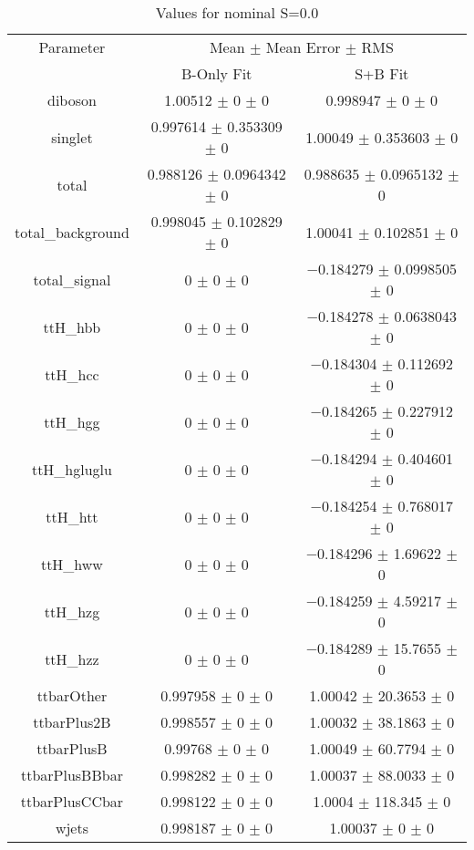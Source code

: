 \begin{table}
\centering
\caption{Values for nominal S=0.0}
\begin{tabular}{ccc}
\toprule
Parameter & \multicolumn{2}{c}{Mean $\pm$ Mean Error $\pm$ RMS}\\
 & B-Only Fit & S+B Fit\\
\midrule
diboson & \num{1.00512} $\pm$ \num{0} $\pm$ \num{0} & \num{0.998947} $\pm$ \num{0} $\pm$ \num{0}\\
singlet & \num{0.997614} $\pm$ \num{0.353309} $\pm$ \num{0} & \num{1.00049} $\pm$ \num{0.353603} $\pm$ \num{0}\\
total & \num{0.988126} $\pm$ \num{0.0964342} $\pm$ \num{0} & \num{0.988635} $\pm$ \num{0.0965132} $\pm$ \num{0}\\
total\_background & \num{0.998045} $\pm$ \num{0.102829} $\pm$ \num{0} & \num{1.00041} $\pm$ \num{0.102851} $\pm$ \num{0}\\
total\_signal & \num{0} $\pm$ \num{0} $\pm$ \num{0} & \num{-0.184279} $\pm$ \num{0.0998505} $\pm$ \num{0}\\
ttH\_hbb & \num{0} $\pm$ \num{0} $\pm$ \num{0} & \num{-0.184278} $\pm$ \num{0.0638043} $\pm$ \num{0}\\
ttH\_hcc & \num{0} $\pm$ \num{0} $\pm$ \num{0} & \num{-0.184304} $\pm$ \num{0.112692} $\pm$ \num{0}\\
ttH\_hgg & \num{0} $\pm$ \num{0} $\pm$ \num{0} & \num{-0.184265} $\pm$ \num{0.227912} $\pm$ \num{0}\\
ttH\_hgluglu & \num{0} $\pm$ \num{0} $\pm$ \num{0} & \num{-0.184294} $\pm$ \num{0.404601} $\pm$ \num{0}\\
ttH\_htt & \num{0} $\pm$ \num{0} $\pm$ \num{0} & \num{-0.184254} $\pm$ \num{0.768017} $\pm$ \num{0}\\
ttH\_hww & \num{0} $\pm$ \num{0} $\pm$ \num{0} & \num{-0.184296} $\pm$ \num{1.69622} $\pm$ \num{0}\\
ttH\_hzg & \num{0} $\pm$ \num{0} $\pm$ \num{0} & \num{-0.184259} $\pm$ \num{4.59217} $\pm$ \num{0}\\
ttH\_hzz & \num{0} $\pm$ \num{0} $\pm$ \num{0} & \num{-0.184289} $\pm$ \num{15.7655} $\pm$ \num{0}\\
ttbarOther & \num{0.997958} $\pm$ \num{0} $\pm$ \num{0} & \num{1.00042} $\pm$ \num{20.3653} $\pm$ \num{0}\\
ttbarPlus2B & \num{0.998557} $\pm$ \num{0} $\pm$ \num{0} & \num{1.00032} $\pm$ \num{38.1863} $\pm$ \num{0}\\
ttbarPlusB & \num{0.99768} $\pm$ \num{0} $\pm$ \num{0} & \num{1.00049} $\pm$ \num{60.7794} $\pm$ \num{0}\\
ttbarPlusBBbar & \num{0.998282} $\pm$ \num{0} $\pm$ \num{0} & \num{1.00037} $\pm$ \num{88.0033} $\pm$ \num{0}\\
ttbarPlusCCbar & \num{0.998122} $\pm$ \num{0} $\pm$ \num{0} & \num{1.0004} $\pm$ \num{118.345} $\pm$ \num{0}\\
wjets & \num{0.998187} $\pm$ \num{0} $\pm$ \num{0} & \num{1.00037} $\pm$ \num{0} $\pm$ \num{0}\\
\bottomrule
\end{tabular}
\end{table}